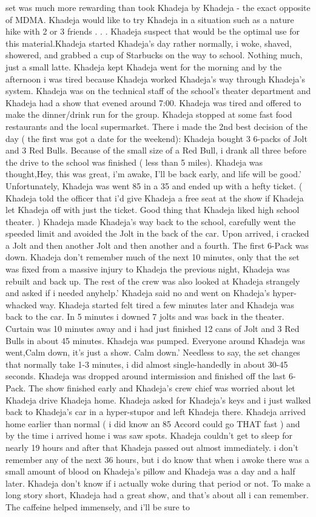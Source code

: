 \documentclass[12pt]{book}
\begin{document}
set was much more rewarding than took Khadeja by Khadeja - the exact opposite of MDMA. Khadeja would like to try Khadeja in a situation such as a nature hike with 2 or 3 friends . . .  Khadeja suspect that would be the optimal use for this material.Khadeja started Khadeja's day rather normally, i woke, shaved, showered, and grabbed a cup of Starbucks on the way to school. Nothing much, just a small latte. Khadeja kept Khadeja went for the morning and by the afternoon i was tired because Khadeja worked Khadeja's way through Khadeja's system. Khadeja was on the technical staff of the school's theater department and Khadeja had a show that evened around 7:00. Khadeja was tired and offered to make the dinner/drink run for the group. Khadeja stopped at some fast food restaurants and the local supermarket. There i made the 2nd best decision of the day ( the first was got a date for the weekend): Khadeja bought 3 6-packs of Jolt and 3 Red Bulls. Because of the small size of a Red Bull, i drank all three before the drive to the school was finished ( less than 5 miles). Khadeja was thought,Hey, this was great, i'm awake, I'll be back early, and life will be good.' Unfortunately, Khadeja was went 85 in a 35 and ended up with a hefty ticket. ( Khadeja told the officer that i'd give Khadeja a free seat at the show if Khadeja let Khadeja off with just the ticket. Good thing that Khadeja liked high school theater. ) Khadeja made Khadeja's way back to the school, carefully went the speeded limit and avoided the Jolt in the back of the car. Upon arrived, i cracked a Jolt and then another Jolt and then another and a fourth. The first 6-Pack was down. Khadeja don't remember much of the next 10 minutes, only that the set was fixed from a massive injury to Khadeja the previous night, Khadeja was rebuilt and back up. The rest of the crew was also looked at Khadeja strangely and asked if i needed anyhelp.' Khadeja said no and went on Khadeja's hyper-whacked way. Khadeja started felt tired a few minutes later and Khadeja was back to the car. In 5 minutes i downed 7 jolts and was back in the theater. Curtain was 10 minutes away and i had just finished 12 cans of Jolt and 3 Red Bulls in about 45 minutes. Khadeja was pumped. Everyone around Khadeja was went,Calm down, it's just a show. Calm down.' Needless to say, the set changes that normally take 1-3 minutes, i did almost single-handedly in about 30-45 seconds. Khadeja was dropped around intermission and finished off the last 6-Pack. The show finished early and Khadeja's crew chief was worried about let Khadeja drive Khadeja home. Khadeja asked for Khadeja's keys and i just walked back to Khadeja's car in a hyper-stupor and left Khadeja there. Khadeja arrived home earlier than normal ( i did know an 85 Accord could go THAT fast ) and by the time i arrived home i was saw spots. Khadeja couldn't get to sleep for nearly 19 hours and after that Khadeja passed out almost immediately. i don't remember any of the next 36 hours, but i do know that when i awoke there was a small amount of blood on Khadeja's pillow and Khadeja was a day and a half later. Khadeja don't know if i actually woke during that period or not. To make a long story short, Khadeja had a great show, and that's about all i can remember. The caffeine helped immensely, and i'll be sure to 
\end{document}

